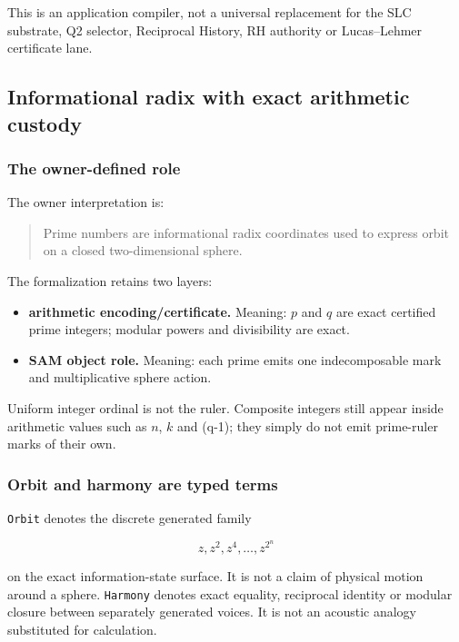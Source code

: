 This is an application compiler, not a universal replacement for the SLC
substrate, Q2 selector, Reciprocal History, RH authority or
Lucas--Lehmer certificate lane.

\subsection{Informational radix with exact arithmetic
custody}\label{viii-ch10-informational-radix-with-exact-arithmetic-custody}

\subsubsection{The owner-defined role}\label{viii-ch10-the-owner-defined-role}

The owner interpretation is:

\begin{quote}
Prime numbers are informational radix coordinates used to express orbit
on a closed two-dimensional sphere.
\end{quote}

The formalization retains two layers:

\begin{itemize}
\tightlist
\item
  \textbf{arithmetic encoding/certificate.} Meaning: \(p\) and \(q\) are
  exact certified prime integers; modular powers and divisibility are
  exact.
\item
  \textbf{SAM object role.} Meaning: each prime emits one indecomposable
  mark and multiplicative sphere action.
\end{itemize}

Uniform integer ordinal is not the ruler. Composite integers still
appear inside arithmetic values such as \(n\), \(k\) and (q-1); they
simply do not emit prime-ruler marks of their own.

\subsubsection{Orbit and harmony are typed
terms}\label{viii-ch10-orbit-and-harmony-are-typed-terms}

\texttt{Orbit} denotes the discrete generated family

\[
z,z^2,z^4,\ldots,z^{2^n}
\]

on the exact information-state surface. It is not a claim of physical
motion around a sphere. \texttt{Harmony} denotes exact equality,
reciprocal identity or modular closure between separately generated
voices. It is not an acoustic analogy substituted for calculation.

